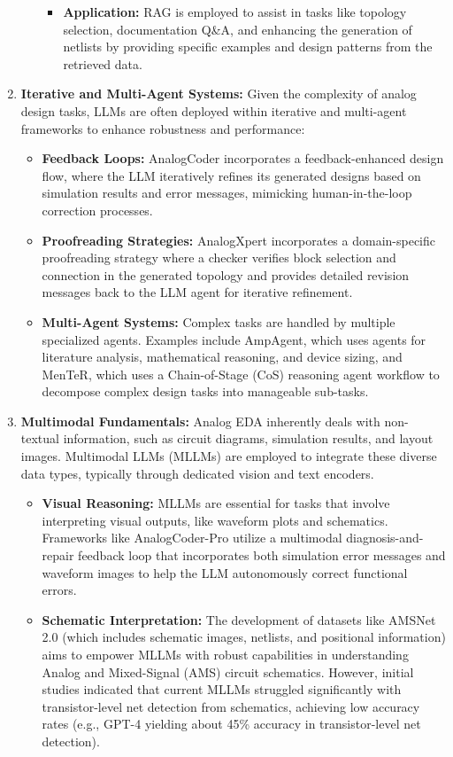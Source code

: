 \documentclass{ieeeaccess}
\begin{document}
\begin{enumerate}
\begin{itemize}
\begin{itemize}
					\item \textbf{Application:} RAG is employed to assist in tasks like topology selection, documentation Q\&A, and enhancing the generation of netlists by providing specific examples and design patterns from the retrieved data.
				\end{itemize}
	    \end{itemize}
	\item \textbf{Iterative and Multi-Agent Systems:} Given the complexity of analog design tasks, LLMs are often deployed within iterative and multi-agent frameworks to enhance robustness and performance:
	    \begin{itemize} %
		    \item \textbf{Feedback Loops:} AnalogCoder incorporates a feedback-enhanced design flow, where the LLM iteratively refines its generated designs based on simulation results and error messages, mimicking human-in-the-loop correction processes.
		    \item \textbf{Proofreading Strategies:} AnalogXpert incorporates a domain-specific proofreading strategy where a checker verifies block selection and connection in the generated topology and provides detailed revision messages back to the LLM agent for iterative refinement.
			\item \textbf{Multi-Agent Systems:} Complex tasks are handled by multiple specialized agents. Examples include AmpAgent, which uses agents for literature analysis, mathematical reasoning, and device sizing, and MenTeR, which uses a Chain-of-Stage (CoS) reasoning agent workflow to decompose complex design tasks into manageable sub-tasks.
	    \end{itemize}
	\item \textbf{Multimodal Fundamentals:} Analog EDA inherently deals with non-textual information, such as circuit diagrams, simulation results, and layout images. Multimodal LLMs (MLLMs) are employed to integrate these diverse data types, typically through dedicated vision and text encoders.
	    \begin{itemize} %
		    \item \textbf{Visual Reasoning:} MLLMs are essential for tasks that involve interpreting visual outputs, like waveform plots and schematics. Frameworks like AnalogCoder-Pro utilize a multimodal diagnosis-and-repair feedback loop that incorporates both simulation error messages and waveform images to help the LLM autonomously correct functional errors.
		    \item \textbf{Schematic Interpretation:} The development of datasets like AMSNet 2.0 (which includes schematic images, netlists, and positional information) aims to empower MLLMs with robust capabilities in understanding Analog and Mixed-Signal (AMS) circuit schematics. However, initial studies indicated that current MLLMs struggled significantly with transistor-level net detection from schematics, achieving low accuracy rates (e.g., GPT-4 yielding about 45\% accuracy in transistor-level net detection).
	    \end{itemize}
\end{enumerate}
\end{document}
